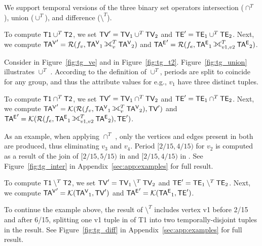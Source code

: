 We support temporal versions of the three binary set operators
intersection ($\cap^T$), union ($\cup^T$), and difference
($\setminus^T$).


To compute $\textsf{T1} \cup^T \textsf{T2}$, we set $\textsf{TV}' = \textsf{TV}_1 \cup^T
\textsf{TV}_2$ and $\textsf{TE}' = \textsf{TE}_1 \cup^T \textsf{TE}_2$.  Next, we compute $\tav' =
\resolve{f_v}{\tav_1 \fullouterjoin^T_{v} \tav_2}$ and $\tae' =
\resolve{f_e}{\tae_1 \fullouterjoin^T_{v1,v2} \tae_2}$. 

Consider  in Figure~\ref{fig:tg_ve} and  in
Figure~\ref{fig:tg_t2}.  Figure~\ref{fig:tg_union} illustrates
 $\cup^T$ .  According to the definition of
$\cup^T$, periods are split to coincide for any group, and thus the
attribute values for e.g., $v_1$ have three distinct tuples.

To compute $\textsf{T1} \cap^T \textsf{T2}$, we set $\textsf{TV}' = \textsf{TV}_1 \cap^T
\textsf{TV}_2$ and $\textsf{TE}' = \textsf{TE}_1 \cap^T \textsf{TE}_2$.  Next, we compute $\tav' =
\constr{\resolve{f_v}{\tav_1 \fullouterjoin^T_{v} \tav_2}}{\tv'}$ and
$\tae' = \constr{\resolve{f_e}{\tae_1 \fullouterjoin^T_{v1,v2}
    \tae_2}}{\te'}$.

As an example, when applying  $\cap^T$ , only the
vertices and edges present in both \tgs are produced, thus eliminating
$v_3$ and $v_4$.  Period $[2/15, 4/15)$ for $v_2$ is computed as a
  result of the join of $[2/15, 5/15)$ in  and [$2/15,
      4/15)$ in .  See Figure~\ref{fig:tg_inter} in
      Appendix~\ref{sec:app:examples} for full result.

To compute $\textsf{T1} \setminus^T \textsf{T2}$, we set $\textsf{TV}' = \textsf{TV}_1
\setminus^T \textsf{TV}_2$ and $\textsf{TE}' = \textsf{TE}_1 \setminus^T \textsf{TE}_2$.  Next, we
compute $\mathsf{TA^{V}}' = \mathcal{K}({\mathsf{TA^{V}}}_1,\textsf{TV}')$ and $\mathsf{TA^{E}}' =
\mathcal{K}({\mathsf{TA^{E}}}_1,\textsf{TE}')$.

To continue the example above, the result of  $\setminus^T$
 includes vertex v1 before 2/15 and after 6/15, splitting
one v1 tuple in \tv of T1 into two temporally-disjoint tuples in the
result.  See Figure~\ref{fig:tg_diff} in
Appendix~\ref{sec:app:examples} for full result.

